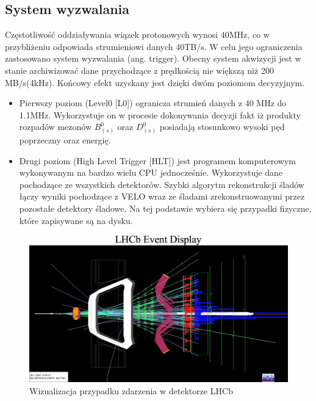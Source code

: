\subsection{System wyzwalania}
Częstotliwość oddziaływania wiązek protonowych wynosi 40MHz, co w przybliżeniu odpowiada strumieniowi danych 40TB/s. W celu jego ograniczenia zastosowano system wyzwalania (ang. trigger). Obecny system akwizycji jest w stanie archiwizować dane przychodzące z prędkością nie większą niż 200 MB/s(4kHz). Końcowy efekt uzyskany jest dzięki dwóm poziomom decyzyjnym.
\begin{itemize}
 \item Pierwszy poziom (Level0 [L0]) ogranicza  strumień danych z 40 MHz do 1.1MHz. Wykorzystuje on w procesie dokonywania decyzji fakt iż produkty rozpadów mezonów $B_{(s)}^0$ oraz $D_{(s)}^0$ posiadają stosunkowo wysoki pęd poprzeczny oraz energię. 
 \item Drugi poziom (High Level Trigger [HLT]) jest programem komputerowym wykonywanym na bardzo wielu CPU jednocześnie. Wykorzystuje dane pochodzące ze wszystkich detektorów. Szybki algorytm rekonstrukcji śladów łączy wyniki pochodzące z VELO wraz ze śladami zrekonstruowanymi przez pozostałe detektory śladowe. Na tej podstawie wybiera się przypadki fizyczne, które zapisywane są na dysku.  
\end{itemize}
\begin{figure}[ht]
  \centering
  \includegraphics[scale=0.5]{rozdzial2/event.jpg}
  \caption{Wizualizacja przypadku zdarzenia w detektorze LHCb\cite{event}}
  \label{fig:event}
\end{figure}
